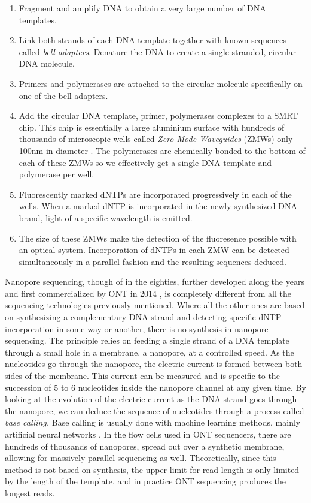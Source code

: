 \documentclass[
  11pt,
  twoside,
  BCOR=10mm,
  listof=totoc]{scrbook}
\providecommand{\tightlist}{%
  \setlength{\itemsep}{0pt}\setlength{\parskip}{0pt}}
\begin{document}
\begin{enumerate}
\def\labelenumi{\arabic{enumi}.}
\tightlist
\item
  Fragment and amplify DNA to obtain a very large number of DNA templates.
\item
  Link both strands of each DNA template together with known sequences called \emph{bell adapters}. Denature the DNA to create a single stranded, circular DNA molecule.
\item
  Primers and polymerases are attached to the circular molecule specifically on one of the bell adapters.
\item
  Add the circular DNA template, primer, polymerases complexes to a SMRT chip. This chip is essentially a large aluminium surface with hundreds of thousands of microscopic wells called \emph{Zero-Mode Waveguides} (ZMWs) only 100nm in diameter \autocite{leveneZeroModeWaveguidesSingleMolecule2003}. The polymerases are chemically bonded to the bottom of each of these ZMWs so we effectively get a single DNA template and polymerase per well.
\item
  Fluorescently marked dNTPs are incorporated progressively in each of the wells. When a marked dNTP is incorporated in the newly synthesized DNA brand, light of a specific wavelength is emitted.
\item
  The size of these ZMWs make the detection of the fluoresence possible with an optical system. Incorporation of dNTPs in each ZMW can be detected simultaneously in a parallel fashion and the resulting sequences deduced.
\end{enumerate}

Nanopore sequencing, though of in the eighties, further developed along the years \autocite{clarkeContinuousBaseIdentification2009} and first commercialized by ONT in 2014 \autocite{deamerThreeDecadesNanopore2016}, is completely different from all the sequencing technologies previously mentioned. Where all the other ones are based on synthesizing a complementary DNA strand and detecting specific dNTP incorporation in some way or another, there is no synthesis in nanopore sequencing. The principle relies on feeding a single strand of a DNA template through a small hole in a membrane, a nanopore, at a controlled speed. As the nucleotides go through the nanopore, the electric current is formed between both sides of the membrane. This current can be measured and is specific to the succession of 5 to 6 nucleotides inside the nanopore channel at any given time. By looking at the evolution of the electric current as the DNA strand goes through the nanopore, we can deduce the sequence of nucleotides through a process called \emph{base calling.} Base calling is usually done with machine learning methods, mainly artificial neural networks \autocite{wickPerformanceNeuralNetwork2019}. In the flow cells used in ONT sequencers, there are hundreds of thousands of nanopores, spread out over a synthetic membrane, allowing for massively parallel sequencing as well. Theoretically, since this method is not based on synthesis, the upper limit for read length is only limited by the length of the template, and in practice ONT sequencing produces the longest reads.
\end{document}
